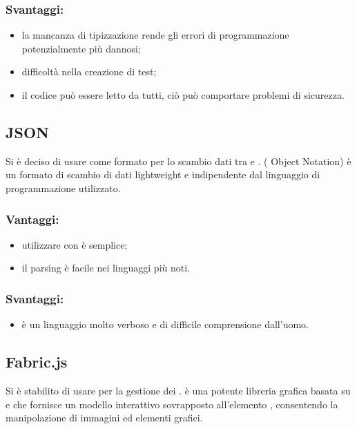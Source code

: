 \documentclass[a4paper, titlepage]{article}
\begin{document}
\subsubsection{Svantaggi:}

\begin{itemize}
	\item la mancanza di tipizzazione rende gli errori di programmazione potenzialmente più dannosi;
	\item difficoltà nella creazione di test;
	\item il codice può essere letto da tutti, ciò può comportare problemi di sicurezza.
\end{itemize}

\subsection{JSON}
Si è deciso di usare  come formato per lo scambio dati tra  e .  ( Object Notation) è un formato di scambio di dati lightweight e indipendente dal linguaggio di programmazione utilizzato.

\subsubsection{Vantaggi:}

\begin{itemize}
	\item utilizzare  con  è semplice;
	\item il parsing è facile nei linguaggi più noti.
\end{itemize}

\subsubsection{Svantaggi:}
	\begin{itemize}
	\item è un linguaggio molto verboso e di difficile comprensione dall'uomo.
	\end{itemize}

\subsection{Fabric.js}
Si è stabilito di usare  per la gestione dei .  è una potente libreria grafica basata su  e  che fornisce un modello interattivo sovrapposto all'elemento , consentendo la manipolazione di immagini ed elementi grafici.
\end{document}
